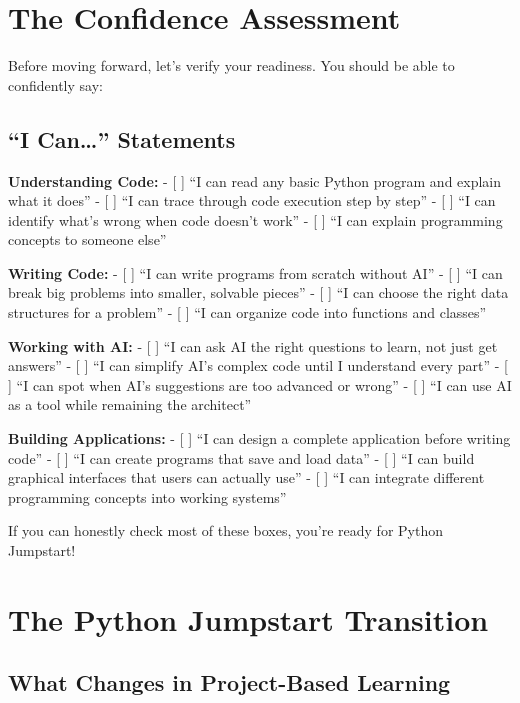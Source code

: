 \documentclass[
  letterpaper,
  DIV=11,
  numbers=noendperiod,
  oneside]{scrreprt}
\begin{document}
\section{The Confidence Assessment}\label{the-confidence-assessment}

Before moving forward, let's verify your readiness. You should be able
to confidently say:

\subsection{\texorpdfstring{``I Can\ldots{}''
Statements}{``I Can\ldots'' Statements}}\label{i-can-statements}

\textbf{Understanding Code:} - {[} {]} ``I can read any basic Python
program and explain what it does'' - {[} {]} ``I can trace through code
execution step by step'' - {[} {]} ``I can identify what's wrong when
code doesn't work'' - {[} {]} ``I can explain programming concepts to
someone else''

\textbf{Writing Code:} - {[} {]} ``I can write programs from scratch
without AI'' - {[} {]} ``I can break big problems into smaller, solvable
pieces'' - {[} {]} ``I can choose the right data structures for a
problem'' - {[} {]} ``I can organize code into functions and classes''

\textbf{Working with AI:} - {[} {]} ``I can ask AI the right questions
to learn, not just get answers'' - {[} {]} ``I can simplify AI's complex
code until I understand every part'' - {[} {]} ``I can spot when AI's
suggestions are too advanced or wrong'' - {[} {]} ``I can use AI as a
tool while remaining the architect''

\textbf{Building Applications:} - {[} {]} ``I can design a complete
application before writing code'' - {[} {]} ``I can create programs that
save and load data'' - {[} {]} ``I can build graphical interfaces that
users can actually use'' - {[} {]} ``I can integrate different
programming concepts into working systems''

If you can honestly check most of these boxes, you're ready for Python
Jumpstart!

\section{The Python Jumpstart
Transition}\label{the-python-jumpstart-transition}

\subsection{What Changes in Project-Based
Learning}\label{what-changes-in-project-based-learning}
\end{document}

